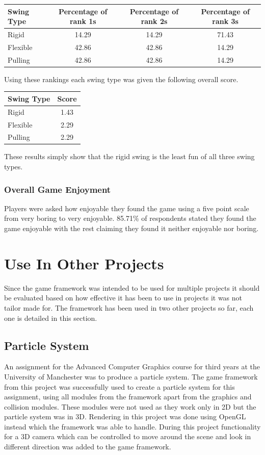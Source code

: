 \documentclass[]{report}
\begin{document}
			\begin{tabular}[H]{ l || c | c | c }
				Swing Type & Percentage of rank 1s & Percentage of rank 2s& Percentage of rank 3s \\
				\hline
		        Rigid & 14.29 & 14.29 & 71.43 \\
		        Flexible & 42.86 & 42.86 & 14.29 \\
		        Pulling & 42.86 & 42.86 & 14.29 \\
			\end{tabular}
			
			Using these rankings each swing type was given the following overall score.
			
			\begin{tabular}[H]{ l || c }
				Swing Type & Score \\
				\hline
				Rigid & 1.43 \\
				Flexible & 2.29 \\
				Pulling & 2.29 \\
			\end{tabular}
			
			These results simply show that the rigid swing is the least fun of all three swing types.
			
			\subsubsection{Overall Game Enjoyment}
			Players were asked how enjoyable they found the game using a five point scale from very boring to very enjoyable. 85.71\% of respondents stated they found the game enjoyable with the rest claiming they found it neither enjoyable nor boring.
			
	\section{Use In Other Projects}
	Since the game framework was intended to be used for multiple projects it should be evaluated based on how effective it has been to use in projects it was not tailor made for. The framework has been used in two other projects so far, each one is detailed in this section.
		\subsection{Particle System}
		An assignment for the Advanced Computer Graphics course for third years at the University of Manchester was to produce a particle system. The game framework from this project was successfully used to create a particle system for this assignment, using all modules from the framework apart from the graphics and collision modules. These modules were not used as they work only in 2D but the particle system was in 3D. Rendering in this project was done using OpenGL instead which the framework was able to handle. During this project functionality for a 3D camera which can be controlled to move around the scene and look in different direction was added to the game framework.
		
\end{document}

